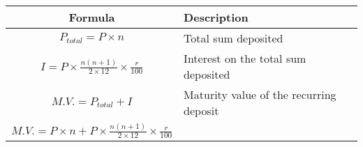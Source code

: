 \begin{tabular}{|c|p{3.2cm}|}
	\hline
	\textbf{Formula}											    & \textbf{Description}			      \\
	\hline
	$P_{total} = P \times n$										    & Total sum deposited			      \\
	\hline
	$I = P \times \frac{n(n + 1)}{2 \times 12} \times \frac{r}{100}$			    & Interest on the total sum deposited     \\
	\hline
	$M.V. = P_{total} + I$										    & Maturity value of the recurring deposit \\
	\cline{1-1}
	$M.V. = P \times n + P \times \frac{n(n + 1)}{2 \times 12} \times \frac{r}{100}$ &							       \\
	\hline
\end{tabular}